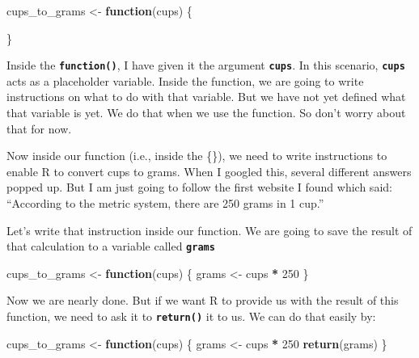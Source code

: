 \documentclass[
]{book}
\newenvironment{Shaded}{\begin{snugshade}}{\end{snugshade}}
\newcommand{\ControlFlowTok}[1]{\textcolor[rgb]{0.13,0.29,0.53}{\textbf{#1}}}
\newcommand{\DecValTok}[1]{\textcolor[rgb]{0.00,0.00,0.81}{#1}}
\newcommand{\FunctionTok}[1]{\textcolor[rgb]{0.13,0.29,0.53}{\textbf{#1}}}
\newcommand{\NormalTok}[1]{#1}
\newcommand{\OtherTok}[1]{\textcolor[rgb]{0.56,0.35,0.01}{#1}}
\newcommand{\SpecialCharTok}[1]{\textcolor[rgb]{0.81,0.36,0.00}{\textbf{#1}}}
\begin{document}
\begin{Shaded}
\begin{Highlighting}[]
\NormalTok{cups\_to\_grams }\OtherTok{\textless{}{-}} \ControlFlowTok{function}\NormalTok{(cups) \{}
  
\NormalTok{\}}
\end{Highlighting}
\end{Shaded}

Inside the \textbf{\texttt{function()}}, I have given it the argument \textbf{\texttt{cups}}. In this scenario, \textbf{\texttt{cups}} acts as a placeholder variable. Inside the function, we are going to write instructions on what to do with that variable. But we have not yet defined what that variable is yet. We do that when we use the function. So don't worry about that for now.

Now inside our function (i.e., inside the \{\}), we need to write instructions to enable R to convert cups to grams. When I googled this, several different answers popped up. But I am just going to follow the first website I found which said: ``According to the metric system, there are 250 grams in 1 cup.''

Let's write that instruction inside our function. We are going to save the result of that calculation to a variable called \textbf{\texttt{grams}}

\begin{Shaded}
\begin{Highlighting}[]
\NormalTok{cups\_to\_grams }\OtherTok{\textless{}{-}} \ControlFlowTok{function}\NormalTok{(cups) \{}
\NormalTok{  grams }\OtherTok{\textless{}{-}}\NormalTok{ cups }\SpecialCharTok{*} \DecValTok{250}
\NormalTok{\}}
\end{Highlighting}
\end{Shaded}

Now we are nearly done. But if we want R to provide us with the result of this function, we need to ask it to \textbf{\texttt{return()}} it to us. We can do that easily by:

\begin{Shaded}
\begin{Highlighting}[]
\NormalTok{cups\_to\_grams }\OtherTok{\textless{}{-}} \ControlFlowTok{function}\NormalTok{(cups) \{}
\NormalTok{  grams }\OtherTok{\textless{}{-}}\NormalTok{ cups }\SpecialCharTok{*} \DecValTok{250}
  \FunctionTok{return}\NormalTok{(grams)}
\NormalTok{\}}
\end{Highlighting}
\end{Shaded}
\end{document}
